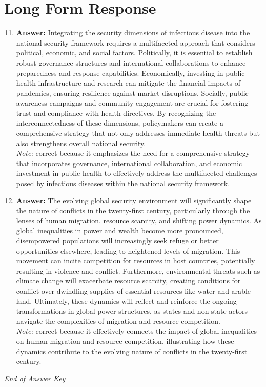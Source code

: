 \documentclass[12pt]{article}
\begin{document}
\section*{Long Form Response}
\begin{enumerate}[label=\arabic*.]
\setcounter{enumi}{10}
\item \textbf{Answer:} Integrating the security dimensions of infectious disease into the national security framework requires a multifaceted approach that considers political, economic, and social factors. Politically, it is essential to establish robust governance structures and international collaborations to enhance preparedness and response capabilities. Economically, investing in public health infrastructure and research can mitigate the financial impacts of pandemics, ensuring resilience against market disruptions. Socially, public awareness campaigns and community engagement are crucial for fostering trust and compliance with health directives. By recognizing the interconnectedness of these dimensions, policymakers can create a comprehensive strategy that not only addresses immediate health threats but also strengthens overall national security.
\\ \textit{Note:} correct because it emphasizes the need for a comprehensive strategy that incorporates governance, international collaboration, and economic investment in public health to effectively address the multifaceted challenges posed by infectious diseases within the national security framework.
\item \textbf{Answer:} The evolving global security environment will significantly shape the nature of conflicts in the twenty-first century, particularly through the lenses of human migration, resource scarcity, and shifting power dynamics. As global inequalities in power and wealth become more pronounced, disempowered populations will increasingly seek refuge or better opportunities elsewhere, leading to heightened levels of migration. This movement can incite competition for resources in host countries, potentially resulting in violence and conflict. Furthermore, environmental threats such as climate change will exacerbate resource scarcity, creating conditions for conflict over dwindling supplies of essential resources like water and arable land. Ultimately, these dynamics will reflect and reinforce the ongoing transformations in global power structures, as states and non-state actors navigate the complexities of migration and resource competition.
\\ \textit{Note:} correct because it effectively connects the impact of global inequalities on human migration and resource competition, illustrating how these dynamics contribute to the evolving nature of conflicts in the twenty-first century.
\end{enumerate}

\vfill
\noindent\textit{End of Answer Key}
\end{document}
